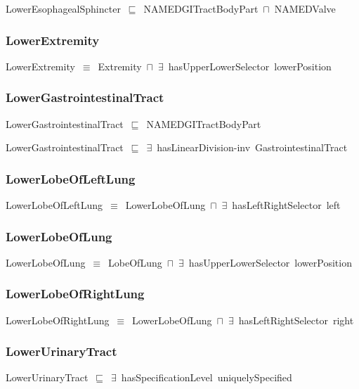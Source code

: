 \documentclass{article}
\begin{document}
LowerEsophagealSphincter~\ensuremath{\sqsubseteq}~NAMEDGITractBodyPart~\ensuremath{\sqcap}~NAMEDValve~

\subsubsection*{LowerExtremity}

LowerExtremity~\ensuremath{\equiv}~Extremity~\ensuremath{\sqcap}~\ensuremath{\exists}~hasUpperLowerSelector~lowerPosition

\subsubsection*{LowerGastrointestinalTract}

LowerGastrointestinalTract~\ensuremath{\sqsubseteq}~NAMEDGITractBodyPart~

LowerGastrointestinalTract~\ensuremath{\sqsubseteq}~\ensuremath{\exists}~hasLinearDivision-inv~GastrointestinalTract~

\subsubsection*{LowerLobeOfLeftLung}

LowerLobeOfLeftLung~\ensuremath{\equiv}~LowerLobeOfLung~\ensuremath{\sqcap}~\ensuremath{\exists}~hasLeftRightSelector~left

\subsubsection*{LowerLobeOfLung}

LowerLobeOfLung~\ensuremath{\equiv}~LobeOfLung~\ensuremath{\sqcap}~\ensuremath{\exists}~hasUpperLowerSelector~lowerPosition

\subsubsection*{LowerLobeOfRightLung}

LowerLobeOfRightLung~\ensuremath{\equiv}~LowerLobeOfLung~\ensuremath{\sqcap}~\ensuremath{\exists}~hasLeftRightSelector~right

\subsubsection*{LowerUrinaryTract}

LowerUrinaryTract~\ensuremath{\sqsubseteq}~\ensuremath{\exists}~hasSpecificationLevel~uniquelySpecified~
\end{document}
